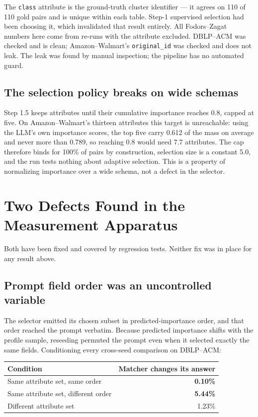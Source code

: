 \documentclass[11pt]{article}
\begin{document}
The \texttt{class} attribute is the ground-truth cluster identifier --- it agrees on
110 of 110 gold pairs and is unique within each table. Step-1 supervised selection had
been choosing it, which invalidated that result entirely. All Fodors--Zagat numbers
here come from re-runs with the attribute excluded. DBLP--ACM was checked and is
clean; Amazon--Walmart's \texttt{original\_id} was checked and does not leak. The leak
was found by manual inspection; the pipeline has no automated guard.

\subsection{The selection policy breaks on wide schemas}

Step 1.5 keeps attributes until their cumulative importance reaches 0.8, capped at
five. On Amazon--Walmart's thirteen attributes this target is unreachable: using the
LLM's own importance scores, the top five carry 0.612 of the mass on average and never
more than 0.789, so reaching 0.8 would need 7.7 attributes. The cap therefore binds
for 100\% of pairs by construction, selection size is a constant 5.0, and the run
tests nothing about adaptive selection. This is a property of normalizing importance
over a wide schema, not a defect in the selector.

\section{Two Defects Found in the Measurement Apparatus}
\label{sec:defects}

Both have been fixed and covered by regression tests. Neither fix was in place for any
result above.

\subsection{Prompt field order was an uncontrolled variable}

The selector emitted its chosen subset in predicted-importance order, and that order
reached the prompt verbatim. Because predicted importance shifts with the profile
sample, reseeding permuted the prompt even when it selected exactly the same fields.
Conditioning every cross-seed comparison on DBLP--ACM:

\begin{center}
\small
\begin{tabular}{lr}
\toprule
Condition & Matcher changes its answer \\
\midrule
Same attribute set, same order & \textbf{0.10\%} \\
Same attribute set, different order & \textbf{5.44\%} \\
Different attribute set & 1.23\% \\
\bottomrule
\end{tabular}
\end{center}
\end{document}
